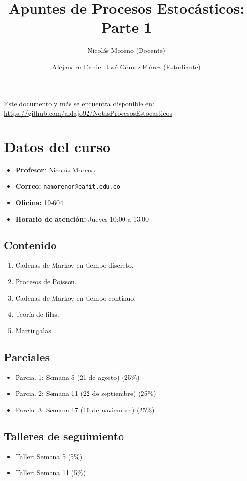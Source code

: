 \documentclass[12pt,a4paper]{article}
\title{Apuntes de Procesos Estocásticos: Parte 1}
\author{Nicolás Moreno (Docente)}
\author{Alejandro Daniel José Gómez Flórez (Estudiante)}
\date{}
\begin{document}
\maketitle

Este documento y más se encuentra disponible en: \\
\url{https://github.com/aldajo92/NotasProcesosEstocasticos}

\section{Datos del curso}
\begin{itemize}
    \item \textbf{Profesor:} Nicolás Moreno
    \item \textbf{Correo:} \texttt{namorenor@eafit.edu.co}
    \item \textbf{Oficina:} 19-604
    \item \textbf{Horario de atención:} Jueves 10:00 a 13:00
\end{itemize}

\subsection*{Contenido}
\begin{enumerate}
    \item Cadenas de Markov en tiempo discreto.
    \item Procesos de Poisson.
    \item Cadenas de Markov en tiempo continuo.
    \item Teoría de filas.
    \item Martingalas.
\end{enumerate}

\subsection*{Parciales}
\begin{itemize}
    \item Parcial 1: Semana 5 (21 de agosto) \hfill (25\%)
    \item Parcial 2: Semana 11 (22 de septiembre) \hfill (25\%)
    \item Parcial 3: Semana 17 (10 de noviembre) \hfill (25\%)
\end{itemize}

\subsection*{Talleres de seguimiento}
\begin{itemize}
    \item Taller: Semana 5 \hfill (5\%)
    \item Taller: Semana 11 \hfill (5\%)
\end{itemize}
\end{document}

